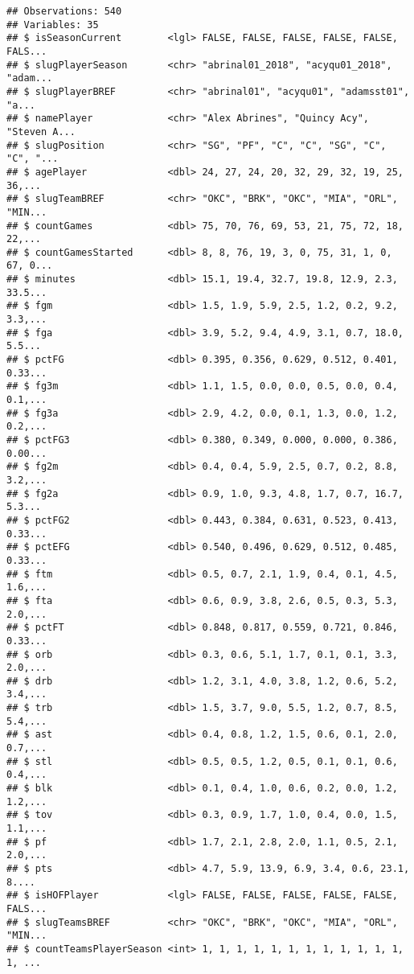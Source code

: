 \documentclass[]{article}
\begin{document}
\begin{verbatim}
## Observations: 540
## Variables: 35
## $ isSeasonCurrent        <lgl> FALSE, FALSE, FALSE, FALSE, FALSE, FALS...
## $ slugPlayerSeason       <chr> "abrinal01_2018", "acyqu01_2018", "adam...
## $ slugPlayerBREF         <chr> "abrinal01", "acyqu01", "adamsst01", "a...
## $ namePlayer             <chr> "Alex Abrines", "Quincy Acy", "Steven A...
## $ slugPosition           <chr> "SG", "PF", "C", "C", "SG", "C", "C", "...
## $ agePlayer              <dbl> 24, 27, 24, 20, 32, 29, 32, 19, 25, 36,...
## $ slugTeamBREF           <chr> "OKC", "BRK", "OKC", "MIA", "ORL", "MIN...
## $ countGames             <dbl> 75, 70, 76, 69, 53, 21, 75, 72, 18, 22,...
## $ countGamesStarted      <dbl> 8, 8, 76, 19, 3, 0, 75, 31, 1, 0, 67, 0...
## $ minutes                <dbl> 15.1, 19.4, 32.7, 19.8, 12.9, 2.3, 33.5...
## $ fgm                    <dbl> 1.5, 1.9, 5.9, 2.5, 1.2, 0.2, 9.2, 3.3,...
## $ fga                    <dbl> 3.9, 5.2, 9.4, 4.9, 3.1, 0.7, 18.0, 5.5...
## $ pctFG                  <dbl> 0.395, 0.356, 0.629, 0.512, 0.401, 0.33...
## $ fg3m                   <dbl> 1.1, 1.5, 0.0, 0.0, 0.5, 0.0, 0.4, 0.1,...
## $ fg3a                   <dbl> 2.9, 4.2, 0.0, 0.1, 1.3, 0.0, 1.2, 0.2,...
## $ pctFG3                 <dbl> 0.380, 0.349, 0.000, 0.000, 0.386, 0.00...
## $ fg2m                   <dbl> 0.4, 0.4, 5.9, 2.5, 0.7, 0.2, 8.8, 3.2,...
## $ fg2a                   <dbl> 0.9, 1.0, 9.3, 4.8, 1.7, 0.7, 16.7, 5.3...
## $ pctFG2                 <dbl> 0.443, 0.384, 0.631, 0.523, 0.413, 0.33...
## $ pctEFG                 <dbl> 0.540, 0.496, 0.629, 0.512, 0.485, 0.33...
## $ ftm                    <dbl> 0.5, 0.7, 2.1, 1.9, 0.4, 0.1, 4.5, 1.6,...
## $ fta                    <dbl> 0.6, 0.9, 3.8, 2.6, 0.5, 0.3, 5.3, 2.0,...
## $ pctFT                  <dbl> 0.848, 0.817, 0.559, 0.721, 0.846, 0.33...
## $ orb                    <dbl> 0.3, 0.6, 5.1, 1.7, 0.1, 0.1, 3.3, 2.0,...
## $ drb                    <dbl> 1.2, 3.1, 4.0, 3.8, 1.2, 0.6, 5.2, 3.4,...
## $ trb                    <dbl> 1.5, 3.7, 9.0, 5.5, 1.2, 0.7, 8.5, 5.4,...
## $ ast                    <dbl> 0.4, 0.8, 1.2, 1.5, 0.6, 0.1, 2.0, 0.7,...
## $ stl                    <dbl> 0.5, 0.5, 1.2, 0.5, 0.1, 0.1, 0.6, 0.4,...
## $ blk                    <dbl> 0.1, 0.4, 1.0, 0.6, 0.2, 0.0, 1.2, 1.2,...
## $ tov                    <dbl> 0.3, 0.9, 1.7, 1.0, 0.4, 0.0, 1.5, 1.1,...
## $ pf                     <dbl> 1.7, 2.1, 2.8, 2.0, 1.1, 0.5, 2.1, 2.0,...
## $ pts                    <dbl> 4.7, 5.9, 13.9, 6.9, 3.4, 0.6, 23.1, 8....
## $ isHOFPlayer            <lgl> FALSE, FALSE, FALSE, FALSE, FALSE, FALS...
## $ slugTeamsBREF          <chr> "OKC", "BRK", "OKC", "MIA", "ORL", "MIN...
## $ countTeamsPlayerSeason <int> 1, 1, 1, 1, 1, 1, 1, 1, 1, 1, 1, 1, 1, ...
\end{verbatim}
\end{document}
